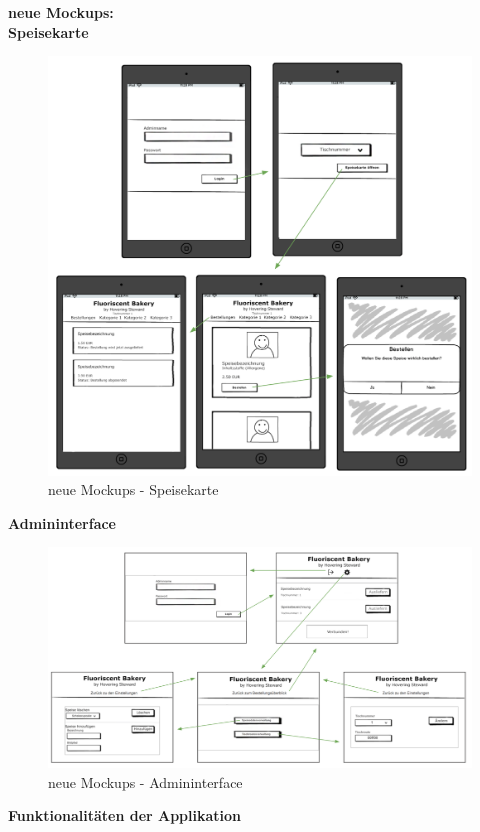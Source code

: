 \textbf{neue Mockups:}\\
\textbf{Speisekarte}\\
			\begin{figure}[H]
			\begin{centering}
			\includegraphics[width = 1\textwidth]{Bilder/Jok_neue_mockups}
			\par\end{centering}
			\caption{neue Mockups - Speisekarte}
			\label{neue Mockups - Speisekarte}
			\end{figure}
\pagebreak
\textbf{Admininterface}\\
			\begin{figure}[H]
			\begin{centering}
			\includegraphics[width = 1\textwidth]{Bilder/Jok_neue_mockups_admin}
			\par\end{centering}
			\caption{neue Mockups - Admininterface}
			\label{neue Mockups - Admininterface}
			\end{figure}\textbf{Funktionalitäten der Applikation}\\
